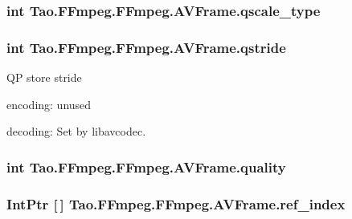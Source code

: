 \hypertarget{struct_tao_1_1_f_fmpeg_1_1_f_fmpeg_1_1_a_v_frame_a76568fa6d51ac1385878c5efe9a49af0}{
\subsubsection[{qscale\_\-type}]{\setlength{\rightskip}{0pt plus 5cm}int {\bf Tao.FFmpeg.FFmpeg.AVFrame.qscale\_\-type}}}
\label{struct_tao_1_1_f_fmpeg_1_1_f_fmpeg_1_1_a_v_frame_a76568fa6d51ac1385878c5efe9a49af0}
\hypertarget{struct_tao_1_1_f_fmpeg_1_1_f_fmpeg_1_1_a_v_frame_aead6278a888fe7a9237e6b61e3770ba8}{
\subsubsection[{qstride}]{\setlength{\rightskip}{0pt plus 5cm}int {\bf Tao.FFmpeg.FFmpeg.AVFrame.qstride}}}
\label{struct_tao_1_1_f_fmpeg_1_1_f_fmpeg_1_1_a_v_frame_aead6278a888fe7a9237e6b61e3770ba8}
QP store stride
\begin{DoxyItemize}
\item encoding: unused
\item decoding: Set by libavcodec. 
\end{DoxyItemize}\hypertarget{struct_tao_1_1_f_fmpeg_1_1_f_fmpeg_1_1_a_v_frame_adcb379855ce61aaa4e9628536374a1ee}{
\subsubsection[{quality}]{\setlength{\rightskip}{0pt plus 5cm}int {\bf Tao.FFmpeg.FFmpeg.AVFrame.quality}}}
\label{struct_tao_1_1_f_fmpeg_1_1_f_fmpeg_1_1_a_v_frame_adcb379855ce61aaa4e9628536374a1ee}
\hypertarget{struct_tao_1_1_f_fmpeg_1_1_f_fmpeg_1_1_a_v_frame_a776a09ab7c80f6cca5cb7c1a813b2740}{
\subsubsection[{ref\_\-index}]{\setlength{\rightskip}{0pt plus 5cm}IntPtr \mbox{[}$\,$\mbox{]} {\bf Tao.FFmpeg.FFmpeg.AVFrame.ref\_\-index}}}
\label{struct_tao_1_1_f_fmpeg_1_1_f_fmpeg_1_1_a_v_frame_a776a09ab7c80f6cca5cb7c1a813b2740}


